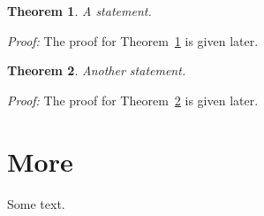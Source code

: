 \documentclass{article}
\newtheorem{theorem}{Theorem}
\newcommand{\off}[1]{}
\begin{document}
\begin{theorem}\label{th:a}
A statement.
\end{theorem}

{\em Proof:} The proof for Theorem~\ref{th:a} is given later.

\begin{theorem}\label{th:b}
Another statement.
\end{theorem}
\off{An old argument.}

{\em Proof:} The proof for Theorem~\ref{th:b} is given later.

\section{More}
Some text.
\end{document}
